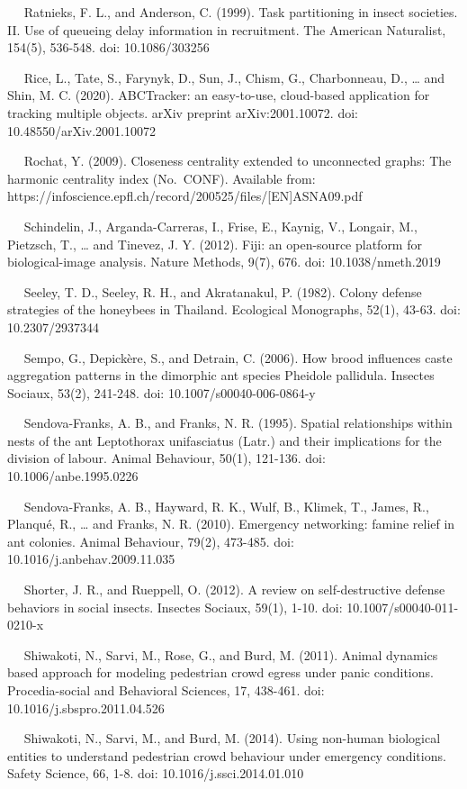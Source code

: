 \documentclass[3p]{elsarticle} %
\begin{document}
~~ Ratnieks, F. L., and Anderson, C. (1999). Task partitioning in insect
societies. II. Use of queueing delay information in recruitment. The
American Naturalist, 154(5), 536-548. doi: 10.1086/303256

~~ Rice, L., Tate, S., Farynyk, D., Sun, J., Chism, G., Charbonneau, D.,
\ldots{} and Shin, M. C. (2020). ABCTracker: an easy-to-use, cloud-based
application for tracking multiple objects. arXiv preprint
arXiv:2001.10072. doi: 10.48550/arXiv.2001.10072

~~ Rochat, Y. (2009). Closeness centrality extended to unconnected
graphs: The harmonic centrality index (No.~CONF). Available from:
https://infoscience.epfl.ch/record/200525/files/{[}EN{]}ASNA09.pdf

~~ Schindelin, J., Arganda-Carreras, I., Frise, E., Kaynig, V., Longair,
M., Pietzsch, T., \ldots{} and Tinevez, J. Y. (2012). Fiji: an
open-source platform for biological-image analysis. Nature Methods,
9(7), 676. doi: 10.1038/nmeth.2019

~~ Seeley, T. D., Seeley, R. H., and Akratanakul, P. (1982). Colony
defense strategies of the honeybees in Thailand. Ecological Monographs,
52(1), 43-63. doi: 10.2307/2937344

~~ Sempo, G., Depickère, S., and Detrain, C. (2006). How brood
influences caste aggregation patterns in the dimorphic ant species
Pheidole pallidula. Insectes Sociaux, 53(2), 241-248. doi:
10.1007/s00040-006-0864-y

~~ Sendova-Franks, A. B., and Franks, N. R. (1995). Spatial
relationships within nests of the ant Leptothorax unifasciatus (Latr.)
and their implications for the division of labour. Animal Behaviour,
50(1), 121-136. doi: 10.1006/anbe.1995.0226

~~ Sendova-Franks, A. B., Hayward, R. K., Wulf, B., Klimek, T., James,
R., Planqué, R., \ldots{} and Franks, N. R. (2010). Emergency
networking: famine relief in ant colonies. Animal Behaviour, 79(2),
473-485. doi: 10.1016/j.anbehav.2009.11.035

~~ Shorter, J. R., and Rueppell, O. (2012). A review on self-destructive
defense behaviors in social insects. Insectes Sociaux, 59(1), 1-10. doi:
10.1007/s00040-011-0210-x

~~ Shiwakoti, N., Sarvi, M., Rose, G., and Burd, M. (2011). Animal
dynamics based approach for modeling pedestrian crowd egress under panic
conditions. Procedia-social and Behavioral Sciences, 17, 438-461. doi:
10.1016/j.sbspro.2011.04.526

~~ Shiwakoti, N., Sarvi, M., and Burd, M. (2014). Using non-human
biological entities to understand pedestrian crowd behaviour under
emergency conditions. Safety Science, 66, 1-8. doi:
10.1016/j.ssci.2014.01.010
\end{document}
